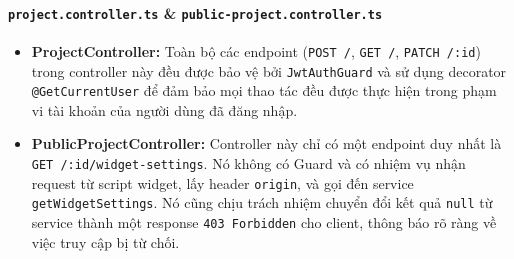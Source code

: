 \paragraph{\texttt{project.controller.ts} \& \texttt{public-project.controller.ts}}
\begin{itemize}
    \item \textbf{ProjectController:} Toàn bộ các endpoint (\texttt{POST /}, \texttt{GET /}, \texttt{PATCH /:id}) trong controller này đều được bảo vệ bởi \texttt{JwtAuthGuard} và sử dụng decorator \texttt{@GetCurrentUser} để đảm bảo mọi thao tác đều được thực hiện trong phạm vi tài khoản của người dùng đã đăng nhập.
    
    \item \textbf{PublicProjectController:} Controller này chỉ có một endpoint duy nhất là \texttt{GET /:id/widget-settings}. Nó không có Guard và có nhiệm vụ nhận request từ script widget, lấy header \texttt{origin}, và gọi đến service \texttt{getWidgetSettings}. Nó cũng chịu trách nhiệm chuyển đổi kết quả \texttt{null} từ service thành một response \texttt{403 Forbidden} cho client, thông báo rõ ràng về việc truy cập bị từ chối.
\end{itemize}